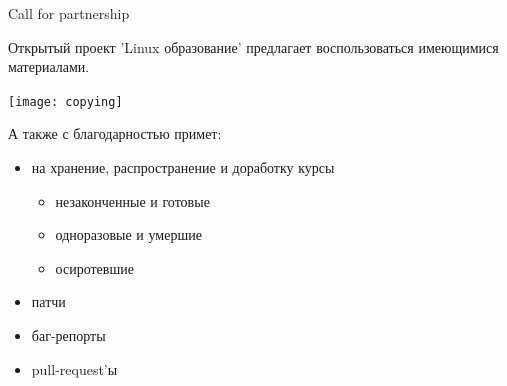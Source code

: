 \begin{frame}{Call for partnership}
  
  \begin{center}
    Открытый проект 'Linux образование' предлагает воспользоваться имеющимися материалами.
    
    \texttt{[image: copying]}
  \end{center}

  А также с благодарностью примет:
  \begin{itemize}
    \item на хранение, распространение и доработку курсы
      \begin{itemize}
	\item незаконченные и готовые
	\item одноразовые и умершие
	\item осиротевшие
      \end{itemize}
    \item патчи
    \item баг-репорты
    \item pull-request'ы
  \end{itemize}

\end{frame}
